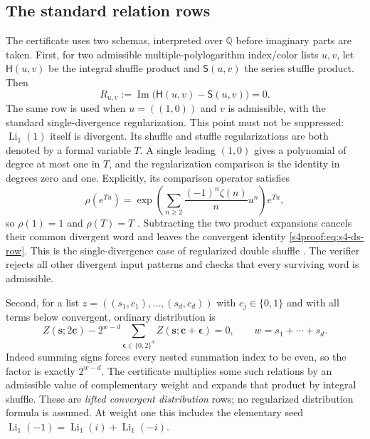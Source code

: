 \subsection{The standard relation rows}
The certificate uses two schemas, interpreted over $\mathbb Q$ before
imaginary parts are taken.
First, for two admissible multiple-polylogarithm index/color lists $u,v$,
let $\mathsf H(u,v)$ be the integral shuffle product and
$\mathsf S(u,v)$ the series stuffle product. Then
\begin{equation}\label{s4proof:eq:s4-ds-row}
 R_{u,v}:=\operatorname{Im}\bigl(\mathsf H(u,v)-\mathsf S(u,v)\bigr)=0.
\end{equation}
The same row is used when $u=((1,0))$ and $v$ is admissible, with the standard
single-divergence regularization. This point must not be suppressed:
$\operatorname{Li}_1(1)$ itself is divergent. Its shuffle and stuffle
regularizations are both denoted by a formal variable $T$. A single leading
$(1,0)$ gives a polynomial of degree at most one in $T$, and the
regularization comparison is the identity in degrees zero and one.
Explicitly, its comparison operator satisfies
\[
 \rho(e^{Tu})=\exp\!\left(\sum_{n\ge2}\frac{(-1)^n\zeta(n)}n u^n\right)e^{Tu},
\]
so $\rho(1)=1$ and $\rho(T)=T$ \cite[Theorem~2.9]{gaussian:Zhao}.
Subtracting the two product expansions cancels their common divergent word
and leaves the convergent identity \eqref{s4proof:eq:s4-ds-row}. This is the
single-divergence case of regularized double shuffle
\cite{s4proof:racinet2002,gaussian:Zhao}. The verifier rejects all other divergent input
patterns and checks that every surviving word is admissible.

Second, for a list $z=((s_1,c_1),\ldots,(s_d,c_d))$ with
$c_j\in\{0,1\}$ and with all terms below convergent, ordinary distribution
is
\begin{equation}\label{s4proof:eq:s4-distribution-row}
 Z(\boldsymbol s;2\boldsymbol c)
 -2^{w-d}\sum_{\boldsymbol\epsilon\in\{0,2\}^d}
 Z(\boldsymbol s;\boldsymbol c+\boldsymbol\epsilon)=0,
 \qquad w=s_1+\cdots+s_d.
\end{equation}
Indeed summing signs forces every nested summation index to be even, so the
factor is exactly $2^{w-d}$. The certificate multiplies some such relations
by an admissible value of complementary weight and expands that product by
integral shuffle. These are \emph{lifted convergent distribution} rows; no
regularized distribution formula is assumed. At weight one this includes
the elementary seed $\operatorname{Li}_1(-1)=
\operatorname{Li}_1(i)+\operatorname{Li}_1(-i)$.


